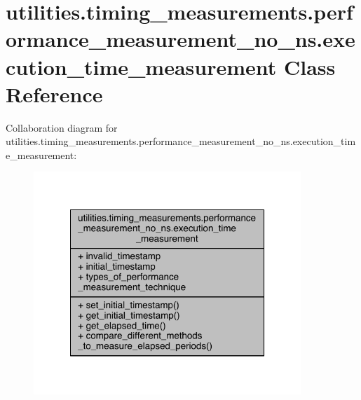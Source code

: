 \hypertarget{classutilities_1_1timing__measurements_1_1performance__measurement__no__ns_1_1execution__time__measurement}{}\section{utilities.\+timing\+\_\+measurements.\+performance\+\_\+measurement\+\_\+no\+\_\+ns.\+execution\+\_\+time\+\_\+measurement Class Reference}
\label{classutilities_1_1timing__measurements_1_1performance__measurement__no__ns_1_1execution__time__measurement}


Collaboration diagram for utilities.\+timing\+\_\+measurements.\+performance\+\_\+measurement\+\_\+no\+\_\+ns.\+execution\+\_\+time\+\_\+measurement\+:
\nopagebreak
\begin{figure}[H]
\begin{center}
\leavevmode
\includegraphics[width=286pt]{d1/d53/classutilities_1_1timing__measurements_1_1performance__measurement__no__ns_1_1execution__time__measurement__coll__graph}
\end{center}
\end{figure}
